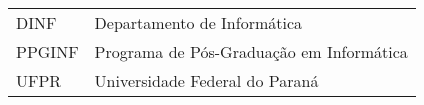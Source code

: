 

\begin{listaacron}

\begin{longtable}{ll}
DINF & Departamento de Informática\\
PPGINF & Programa de Pós-Graduação em Informática\\
UFPR & Universidade Federal do Paraná\\
\end{longtable}

\end{listaacron}

